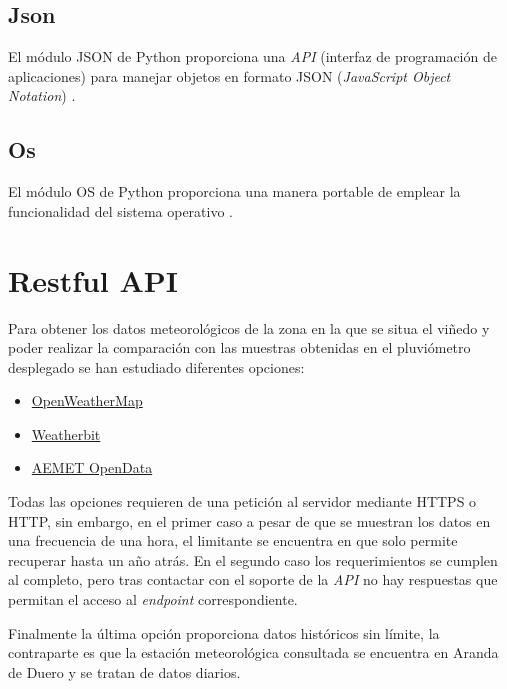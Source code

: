 \subsection{Json}
El módulo JSON de Python proporciona una \textit{API} (interfaz de programación de 
aplicaciones) para manejar objetos en formato JSON (\textit{JavaScript Object 
Notation}) \cite{python:json2023}.

\subsection{Os}
El módulo OS de Python proporciona una manera portable de emplear la funcionalidad del
sistema operativo \cite{python:os2023}.

\section{Restful API}
Para obtener los datos meteorológicos de la zona en la que se situa el viñedo y poder
realizar la comparación con las muestras obtenidas en el pluviómetro desplegado se han 
estudiado diferentes opciones:
\begin{itemize}
    \item \href{https://openweathermap.org/}{OpenWeatherMap}
    \item \href{https://www.weatherbit.io/}{Weatherbit}
    \item \href{https://www.aemet.es/es/datos_abiertos/AEMET_OpenData}{AEMET OpenData}
\end{itemize}

Todas las opciones requieren de una petición al servidor mediante HTTPS o HTTP, sin 
embargo, en el primer caso a pesar de que se muestran los datos en una frecuencia 
de una hora, el limitante se encuentra en que solo permite recuperar hasta un año atrás.
En el segundo caso los requerimientos se cumplen al completo, pero tras contactar con el
soporte de la \textit{API} no hay respuestas que permitan el acceso al 
\textit{endpoint} correspondiente.

Finalmente la última opción proporciona datos históricos sin límite, la contraparte es
que la estación meteorológica consultada se encuentra en Aranda de Duero y se tratan de
datos diarios.
